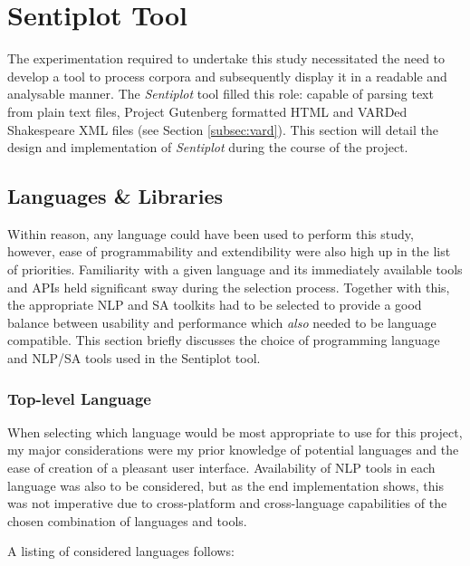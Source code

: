 \documentclass{article}
\begin{document}
{\section{Sentiplot Tool}
\label{sec:sentiplot}
The experimentation required to undertake this study necessitated the need to develop a tool to process corpora and subsequently display it in a readable and analysable manner. The \textit{Sentiplot} tool filled this role: capable of parsing text from plain text files, Project Gutenberg formatted HTML and VARDed Shakespeare XML files (see Section \ref{subsec:vard}). This section will detail the design and implementation of \textit{Sentiplot} during the course of the project. 
    \subsection{Languages \& Libraries}
    Within reason, any language could have been used to perform this study, however, ease of programmability and extendibility were also high up in the list of priorities. Familiarity with a given language and its immediately available tools and APIs held significant sway during the selection process. Together with this, the appropriate NLP and SA toolkits had to be selected to provide a good balance between usability and performance which \textit{also} needed to be language compatible. This section briefly discusses the choice of programming language and NLP/SA tools used in the Sentiplot tool.
        \subsubsection{Top-level Language}
        \label{subsec:language}
        When selecting which language would be most appropriate to use for this project, my major considerations were my prior knowledge of potential languages and the ease of creation of a pleasant user interface. Availability of NLP tools in each language was also to be considered, but as the end implementation shows, this was not imperative due to cross-platform and cross-language capabilities of the chosen combination of languages and tools.

        A listing of considered languages follows:

}
\end{document}
